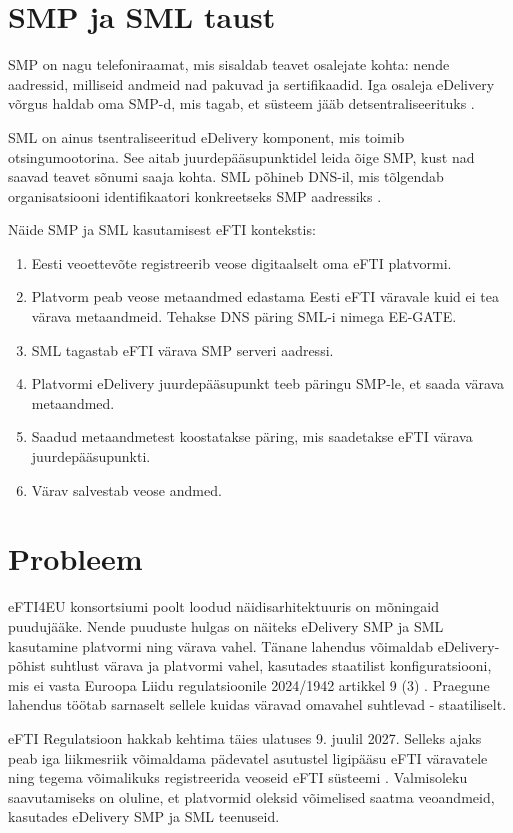 \section{SMP ja SML taust}

SMP on nagu telefoniraamat, mis sisaldab teavet osalejate kohta: 
nende aadressid, milliseid andmeid nad pakuvad ja sertifikaadid.
Iga osaleja eDelivery võrgus haldab oma SMP-d, mis tagab, et süsteem jääb detsentraliseerituks \cite{ria_edelivery_selgitus}. 

SML on ainus tsentraliseeritud eDelivery komponent, mis toimib otsingumootorina.
See aitab juurdepääsupunktidel leida õige SMP, kust nad saavad teavet sõnumi saaja kohta.
SML põhineb DNS-il, mis tõlgendab organisatsiooni identifikaatori konkreetseks SMP aadressiks \cite{ria_edelivery_selgitus}. 

Näide SMP ja SML kasutamisest eFTI kontekstis:
\begin{enumerate}
  \item Eesti veoettevõte registreerib veose digitaalselt oma eFTI platvormi.
  \item Platvorm peab veose metaandmed edastama Eesti eFTI väravale kuid ei tea värava metaandmeid. Tehakse DNS päring SML-i nimega EE-GATE.
  \item SML tagastab eFTI värava SMP serveri aadressi.
  \item Platvormi eDelivery juurdepääsupunkt teeb päringu SMP-le, et saada värava metaandmed.
  \item Saadud metaandmetest koostatakse päring, mis saadetakse eFTI värava juurdepääsupunkti.
  \item Värav salvestab veose andmed.
\end{enumerate}

\section{Probleem}

eFTI4EU konsortsiumi poolt loodud näidisarhitektuuris on mõningaid puudujääke. 
Nende puuduste hulgas on näiteks eDelivery SMP ja SML kasutamine platvormi ning värava vahel.
Tänane lahendus võimaldab eDelivery-põhist suhtlust värava ja platvormi vahel, kasutades staatilist konfiguratsiooni,
mis ei vasta Euroopa Liidu regulatsioonile 2024/1942 artikkel 9 (3) \cite{eu_reg_2024_1942}.
Praegune lahendus töötab sarnaselt sellele kuidas väravad omavahel suhtlevad - staatiliselt.

eFTI Regulatsioon hakkab kehtima täies ulatuses 9. juulil 2027. 
Selleks ajaks peab iga liikmesriik võimaldama pädevatel asutustel ligipääsu eFTI väravatele ning
tegema võimalikuks registreerida veoseid eFTI süsteemi \cite{eu_efti_regulation}.  
Valmisoleku saavutamiseks on oluline, et platvormid oleksid võimelised saatma
veoandmeid, kasutades eDelivery SMP ja SML teenuseid.

